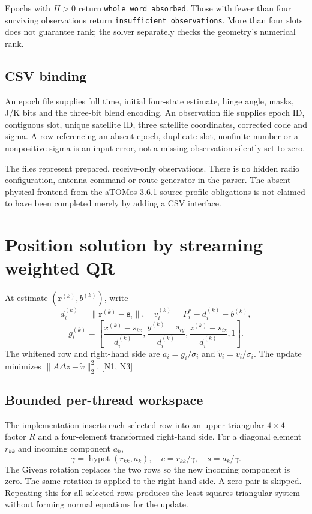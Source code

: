 \documentclass[11pt,a4paper]{article}
\newcommand{\code}[1]{\texttt{#1}}
\begin{document}
Epochs with $H>0$ return \code{whole\_word\_absorbed}. Those with fewer than four surviving observations return
\code{insufficient\_observations}. More than four slots does not guarantee rank; the solver separately checks
the geometry's numerical rank.

\subsection{CSV binding}
An epoch file supplies full time, initial four-state estimate, hinge angle, masks, J/K bits and the three-bit
blend encoding. An observation file supplies epoch ID, contiguous slot, unique satellite ID, three satellite
coordinates, corrected code and sigma. A row referencing an absent epoch, duplicate slot, nonfinite number
or a nonpositive sigma is an input error, not a missing observation silently set to zero.

The files represent prepared, receive-only observations. There is no hidden radio configuration, antenna
command or route generator in the parser. The absent physical frontend from the aTOMos 3.6.1 source-profile
obligations is not claimed to have been completed merely by adding a CSV interface.
\clearpage

\section{Position solution by streaming weighted QR}
At estimate $(\mathbf r^{(k)},b^{(k)})$, write
\begin{equation}
d_i^{(k)}=\|\mathbf r^{(k)}-\mathbf s_i\|,
\quad v_i^{(k)}=P_i^*-d_i^{(k)}-b^{(k)},
\end{equation}
\begin{equation}
g_i^{(k)}=\left[\frac{x^{(k)}-s_{ix}}{d_i^{(k)}},
\frac{y^{(k)}-s_{iy}}{d_i^{(k)}},
\frac{z^{(k)}-s_{iz}}{d_i^{(k)}},1\right].
\end{equation}
The whitened row and right-hand side are $a_i=g_i/\sigma_i$ and $\tilde v_i=v_i/\sigma_i$.
The update minimizes $\|A\Delta z-\tilde v\|_2^2$. [N1, N3]

\subsection{Bounded per-thread workspace}
The implementation inserts each selected row into an upper-triangular $4\times4$ factor $R$ and a
four-element transformed right-hand side. For a diagonal element $r_{kk}$ and incoming component $a_k$,
\begin{equation}
\gamma=\operatorname{hypot}(r_{kk},a_k),\quad c=r_{kk}/\gamma,\quad s=a_k/\gamma.
\end{equation}
The Givens rotation replaces the two rows so the new incoming component is zero. The same rotation is
applied to the right-hand side. A zero pair is skipped. Repeating this for all selected rows produces the
least-squares triangular system without forming normal equations for the update.
\end{document}
